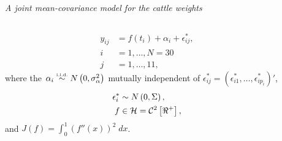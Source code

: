 \begin{frame}{\textit{A joint mean-covariance model for the cattle weights}}
\begin{columns}
\begin{column}{6cm}
\begin{align*}
y_{ij} &= f\left(t_i  \right) + \alpha_i + \epsilon^*_{ij}, \\
 i &= 1, \dots, N=30\\ 
 j &= 1, \dots, 11,
\end{align*} 
where the $\alpha_i \stackrel{\mbox{\tiny{i.i.d.}}}{\sim} N\left(0 ,\sigma_\alpha^2\right)$ mutually independent of $ \epsilon^*_{ij} = \left( \epsilon^*_{i1},\dots, \epsilon^*_{ip_i} \right)'$,
\begin{align*}
\epsilon^*_i &\sim N\left(0, \Sigma\right),\\
f &\in \mathcal{H}  = \mathcal{C}^2\left[\Re^+\right],
\end{align*} \footnotesize
and $J\left(f\right) = \int_0^1 \left(f''\left(x\right)\right)^2\;dx$.
\end{column}
\begin{column}{5.5cm}
\centering
{}
\end{column}
\end{columns} 
\end{frame}


